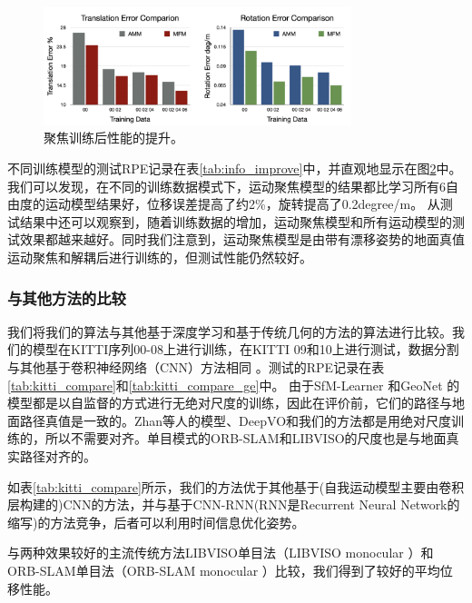 {\begin{figure}[ht]
{\label{fig:training_loss}}
\end{figure}
\begin{figure}[h]
    \centering
    \includegraphics[width=0.8\textwidth]{datavo/focusing_train.png}
    \caption{聚焦训练后性能的提升。}
    \label{fig:focucing_train}
\end{figure}
不同训练模型的测试RPE记录在表\ref{tab:info_improve}中，并直观地显示在图\ref{fig:focucing_train}中。
我们可以发现，在不同的训练数据模式下，运动聚焦模型的结果都比学习所有6自由度的运动模型结果好，位移误差提高了约2\%，旋转提高了0.2degree/m。
从测试结果中还可以观察到，随着训练数据的增加，运动聚焦模型和所有运动模型的测试效果都越来越好。同时我们注意到，运动聚焦模型是由带有漂移姿势的地面真值{运动聚焦和解耦后}进行训练的，但测试性能仍然较好。

\subsubsection{与其他方法的比较}
\label{sec:compare}

我们将我们的算法与其他基于深度学习和{基于传统几何的}方法的算法进行比较。我们的模型在KITTI序列00-08上进行训练，在KITTI 09和10上进行测试，数据分割与其他基于卷积神经网络（CNN）方法相同
\cite{zhan2018unsupervised,zhou2017unsupervised,yin2018geonet}。测试的RPE记录在表\ref{tab:kitti_compare}和\ref{tab:kitti_compare_ge}中。
由于SfM-Learner \cite{zhou2017unsupervised}和GeoNet \cite{yin2018geonet}的模型都是以自监督的方式进行无绝对尺度的训练，因此在评价前，它们的路径与地面路径真值是一致的。Zhan等人的模型\cite{zhan2018unsupervised}、DeepVO\cite{wang2017deepvo}和我们的方法都是用绝对尺度训练的，所以不需要对齐。单目模式的ORB-SLAM\cite{raul2015orb}和LIBVISO\cite{Geiger2011IV}的尺度也是与地面真实路径对齐的。

如表\ref{tab:kitti_compare}所示，我们的方法优于其他基于(自我运动模型主要由卷积层构建的)CNN的方法\cite{zhan2018unsupervised,zhou2017unsupervised,yin2018geonet}，并与基于CNN-RNN{(RNN是Recurrent Neural Network的缩写)}的方法\cite{wang2017deepvo}竞争，后者可以利用时间信息优化姿势。

与两种效果较好的主流传统方法LIBVISO单目法（LIBVISO monocular \cite{Geiger2011IV}）和ORB-SLAM单目法（ORB-SLAM monocular \cite{raul2015orb}）比较，我们得到了较好的平均位移性能。


}
